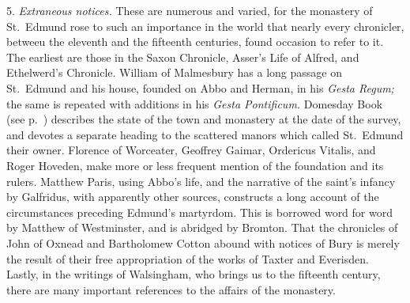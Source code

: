 \documentclass[10pt]{book}
\begin{document}
{5. \emph{Extraneous notices.} These are numerous and varied, for the monastery of St.\ Edmund rose to such an importance in the world that nearly every chronicler, betweeu the eleventh and the fifteenth centuries, found occasion to refer to it. The earliest are those in the Saxon Chronicle, Asser's Life of Alfred, and Ethelwerd's Chronicle. William of Malmesbury has a long passage on St.\ Edmund and his house, founded on Abbo and Herman, in his \emph{Gesta Regum;} the same is repeated with additions in his \emph{Gesta Pontificum.} Domesday Book (see p.\ ) describes the state of the town and monastery at the date of the survey, and devotes a separate heading to the scattered manors which called St.\ Edmund their owner. Florence of Worceater, Geoffrey Gaimar, Ordericus Vitalis, and Roger Hoveden, make more or less frequent mention of the foundation and its rulers. Matthew Paris, using Abbo's life, and the narrative of the saint's infancy by Galfridus, with apparently other sources, constructs a long account of the circumstances preceding Edmund's martyrdom. This is borrowed word for word by Matthew of Westminster, and is abridged by Bromton. That the chronicles of John of Oxnead and Bartholomew Cotton abound with notices of Bury is merely the result of their free appropriation of the works of Taxter and Everisden. Lastly, in the writings of Walsingham, who brings us to the fifteenth century, there are many important references to the affairs of the monastery.


}
\end{document}
